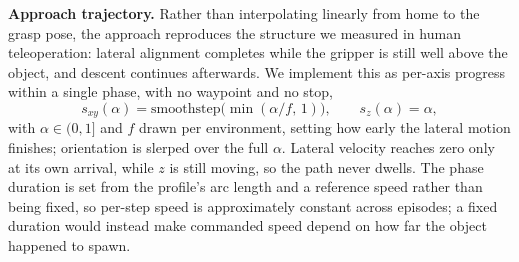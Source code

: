 \noindent\textbf{Approach trajectory.}
Rather than interpolating linearly from home to the grasp pose, the approach reproduces the
structure we measured in human teleoperation: lateral alignment completes while the gripper is
still well above the object, and descent continues afterwards. We implement this as per-axis
progress within a single phase, with no waypoint and no stop,
\begin{equation}
  s_{xy}(\alpha) = \mathrm{smoothstep}\!\bigl(\min(\alpha/f,\,1)\bigr), \qquad
  s_{z}(\alpha) = \alpha ,
  \label{eq:approach}
\end{equation}
with $\alpha\in(0,1]$ and $f$ drawn per environment, setting how early the lateral motion
finishes; orientation is slerped over the full $\alpha$. Lateral velocity reaches zero only at
its own arrival, while $z$ is still moving, so the path never dwells. The phase duration is set
from the profile's arc length and a reference speed rather than being fixed, so per-step speed
is approximately constant across episodes; a fixed duration would instead make commanded speed
depend on how far the object happened to spawn.
